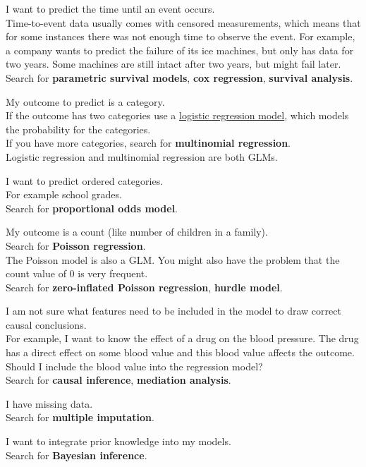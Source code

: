 \documentclass[
  12pt,
]{krantz}
\begin{document}
I want to predict the time until an event occurs.\\
Time-to-event data usually comes with censored measurements, which means that for some instances there was not enough time to observe the event.
For example, a company wants to predict the failure of its ice machines, but only has data for two years.
Some machines are still intact after two years, but might fail later.\\
Search for \textbf{parametric survival models}, \textbf{cox regression}, \textbf{survival analysis}.

My outcome to predict is a category.\\
If the outcome has two categories use a \protect\hyperlink{logistic}{logistic regression model}, which models the probability for the categories.\\
If you have more categories, search for \textbf{multinomial regression}.\\
Logistic regression and multinomial regression are both GLMs.

I want to predict ordered categories.\\
For example school grades.\\
Search for \textbf{proportional odds model}.

My outcome is a count (like number of children in a family).\\
Search for \textbf{Poisson regression}.\\
The Poisson model is also a GLM.
You might also have the problem that the count value of 0 is very frequent.\\
Search for \textbf{zero-inflated Poisson regression}, \textbf{hurdle model}.

I am not sure what features need to be included in the model to draw correct causal conclusions.\\
For example, I want to know the effect of a drug on the blood pressure.
The drug has a direct effect on some blood value and this blood value affects the outcome.
Should I include the blood value into the regression model?\\
Search for \textbf{causal inference}, \textbf{mediation analysis}.

I have missing data.\\
Search for \textbf{multiple imputation}.

I want to integrate prior knowledge into my models.\\
Search for \textbf{Bayesian inference}.
\end{document}
